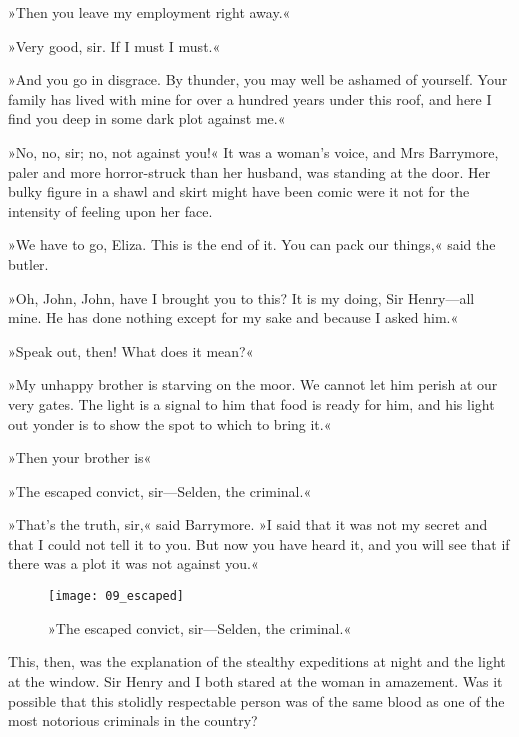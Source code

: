 »Then you leave my employment right away.«

»Very good, sir. If I must I must.«

»And you go in disgrace. By thunder, you may well be ashamed of yourself. Your family has lived with mine for over a hundred years under this roof, and here I find you deep in some dark plot against me.«

»No, no, sir; no, not against you!« It was a woman's voice, and Mrs Barrymore, paler and more horror-struck than her husband, was standing at the door. Her bulky figure in a shawl and skirt might have been comic were it not for the intensity of feeling upon her face.

»We have to go, Eliza. This is the end of it. You can pack our things,« said the butler.

»Oh, John, John, have I brought you to this? It is my doing, Sir Henry—all mine. He has done nothing except for my sake and because I asked him.«

»Speak out, then! What does it mean?«

»My unhappy brother is starving on the moor. We cannot let him perish at our very gates. The light is a signal to him that food is ready for him, and his light out yonder is to show the spot to which to bring it.«

»Then your brother is\longdash«

»The escaped convict, sir—Selden, the criminal.«

»That's the truth, sir,« said Barrymore. »I said that it was not my secret and that I could not tell it to you. But now you have heard it, and you will see that if there was a plot it was not against you.«

\begin{figure}[h!]
\centering
\texttt{[image: 09\_escaped]}
\caption{»The escaped convict, sir—Selden, the criminal.«}
\end{figure}

This, then, was the explanation of the stealthy expeditions at night and the light at the window. Sir Henry and I both stared at the woman in amazement. Was it possible that this stolidly respectable person was of the same blood as one of the most notorious criminals in the country?

